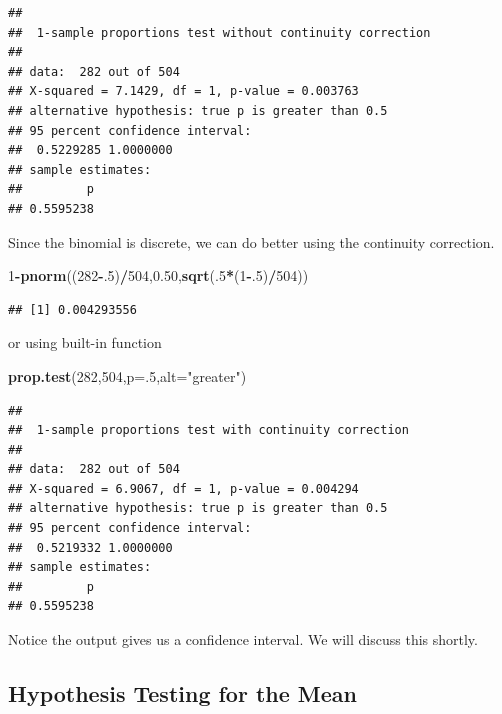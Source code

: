 \documentclass[]{book}
\newenvironment{Shaded}{\begin{snugshade}}{\end{snugshade}}
\newcommand{\KeywordTok}[1]{\textcolor[rgb]{0.13,0.29,0.53}{\textbf{#1}}}
\newcommand{\DataTypeTok}[1]{\textcolor[rgb]{0.13,0.29,0.53}{#1}}
\newcommand{\DecValTok}[1]{\textcolor[rgb]{0.00,0.00,0.81}{#1}}
\newcommand{\FloatTok}[1]{\textcolor[rgb]{0.00,0.00,0.81}{#1}}
\newcommand{\StringTok}[1]{\textcolor[rgb]{0.31,0.60,0.02}{#1}}
\newcommand{\OperatorTok}[1]{\textcolor[rgb]{0.81,0.36,0.00}{\textbf{#1}}}
\newcommand{\NormalTok}[1]{#1}
\theoremstyle{definition}
\theoremstyle{definition}
\theoremstyle{definition}
\theoremstyle{remark}
\begin{document}
\begin{verbatim}
## 
##  1-sample proportions test without continuity correction
## 
## data:  282 out of 504
## X-squared = 7.1429, df = 1, p-value = 0.003763
## alternative hypothesis: true p is greater than 0.5
## 95 percent confidence interval:
##  0.5229285 1.0000000
## sample estimates:
##         p 
## 0.5595238
\end{verbatim}

Since the binomial is discrete, we can do better using the continuity
correction.

\begin{Shaded}
\begin{Highlighting}[]
\DecValTok{1}\OperatorTok{-}\KeywordTok{pnorm}\NormalTok{((}\DecValTok{282}\OperatorTok{-}\NormalTok{.}\DecValTok{5}\NormalTok{)}\OperatorTok{/}\DecValTok{504}\NormalTok{,}\FloatTok{0.50}\NormalTok{,}\KeywordTok{sqrt}\NormalTok{(.}\DecValTok{5}\OperatorTok{*}\NormalTok{(}\DecValTok{1}\OperatorTok{-}\NormalTok{.}\DecValTok{5}\NormalTok{)}\OperatorTok{/}\DecValTok{504}\NormalTok{))}
\end{Highlighting}
\end{Shaded}

\begin{verbatim}
## [1] 0.004293556
\end{verbatim}

or using built-in function

\begin{Shaded}
\begin{Highlighting}[]
\KeywordTok{prop.test}\NormalTok{(}\DecValTok{282}\NormalTok{,}\DecValTok{504}\NormalTok{,}\DataTypeTok{p=}\NormalTok{.}\DecValTok{5}\NormalTok{,}\DataTypeTok{alt=}\StringTok{"greater"}\NormalTok{)}
\end{Highlighting}
\end{Shaded}

\begin{verbatim}
## 
##  1-sample proportions test with continuity correction
## 
## data:  282 out of 504
## X-squared = 6.9067, df = 1, p-value = 0.004294
## alternative hypothesis: true p is greater than 0.5
## 95 percent confidence interval:
##  0.5219332 1.0000000
## sample estimates:
##         p 
## 0.5595238
\end{verbatim}

Notice the output gives us a confidence interval. We will discuss this
shortly.

\subsection{Hypothesis Testing for the
Mean}\label{hypothesis-testing-for-the-mean}
\end{document}
